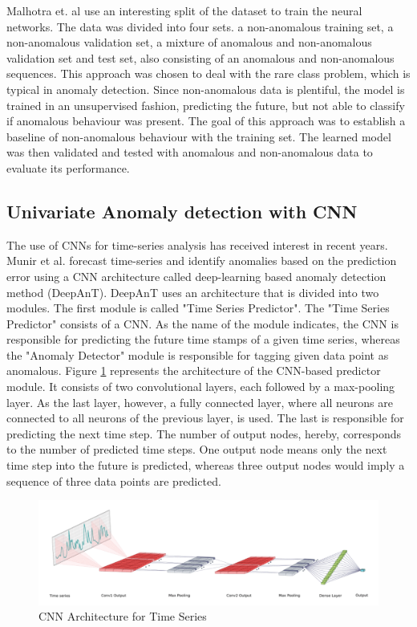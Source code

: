 Malhotra et. al \parencite*{Malhotra2015} use an interesting split of the dataset to train the neural networks. The data was divided into four sets. a non-anomalous training set, a non-anomalous validation set, a mixture of anomalous and non-anomalous validation set and test set, also consisting of an anomalous and non-anomalous sequences. This approach was chosen to deal with the rare class problem, which is typical in anomaly detection. Since non-anomalous data is plentiful, the model is trained in an unsupervised fashion, predicting the future, but not able to classify if anomalous behaviour was present. The goal of this approach was to establish a baseline of non-anomalous behaviour with the training set. The learned model was then validated and tested with anomalous and non-anomalous data to evaluate its performance.



\subsection{Univariate Anomaly detection with CNN} \label{CNN on univariate series}

The use of CNNs for time-series analysis has received interest in recent years. Munir et al. \parencite*{Munir2019} forecast time-series and identify anomalies based on the prediction error using a CNN architecture called deep-learning based anomaly detection method (DeepAnT). DeepAnT uses an architecture that is divided into two modules. The first module is called "Time Series Predictor". The "Time Series Predictor" consists of a CNN. As the name of the module indicates, the CNN is responsible for predicting the future time stamps of a given time series, whereas  the "Anomaly Detector" module is responsible for tagging given data point as anomalous. Figure \ref{fig:CNN} represents the architecture of the CNN-based predictor module. It consists of two convolutional layers, each followed by a max-pooling layer. As the last layer, however, a fully connected layer, where all neurons are connected to all neurons of the previous layer, is used. The last is responsible for predicting the next time step. The number of output nodes, hereby, corresponds to the number of predicted time steps. One output node means only the next time step into the future is predicted, whereas three output nodes would imply a sequence of three data points are predicted.     


\begin{figure}[h]
	\centering
	\includegraphics[scale=0.4]{Figures/CNN}
	\decoRule
	\caption[CNN Architecture for Time Series]{CNN Architecture for Time Series \parencite{Munir2019}}
	\label{fig:CNN}
\end{figure}

